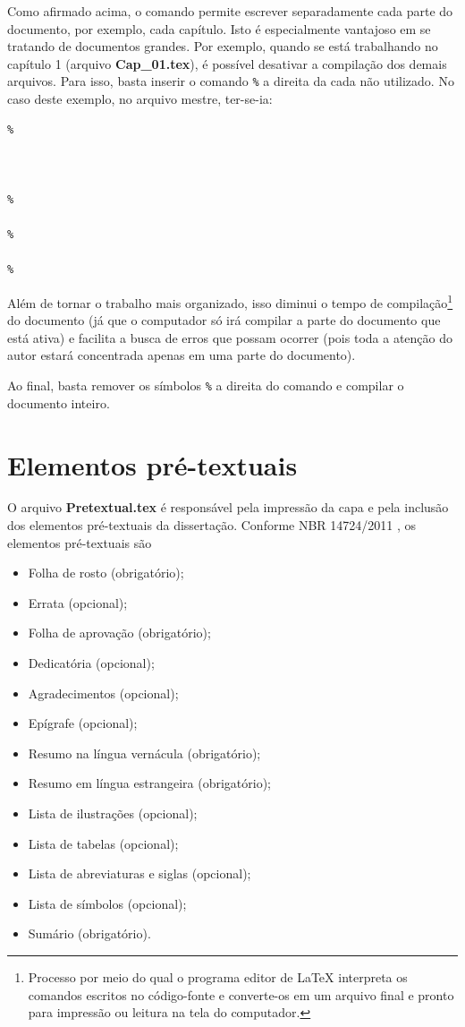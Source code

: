 Como afirmado acima, o comando \verb!! permite escrever separadamente cada parte do documento, por exemplo, cada capítulo. Isto é especialmente vantajoso em se tratando de documentos grandes. Por exemplo, quando se está trabalhando no capítulo 1 (arquivo \textbf{Cap\_01.tex}), é possível desativar a compilação dos demais arquivos. Para isso, basta inserir o comando  \verb!%! a direita da cada \verb!! não utilizado. No caso deste exemplo, no arquivo mestre, ter-se-ia:

\begin{verbatim}
%



%

%

%
\end{verbatim}

Além de tornar o trabalho mais organizado, isso diminui o tempo de compilação\footnote{Processo por meio do qual o programa editor de LaTeX interpreta os comandos escritos no código-fonte e converte-os em um arquivo final e pronto para impressão ou leitura na tela do computador.} do documento (já que o computador só irá compilar a parte do documento que está ativa) e facilita a busca de erros que possam ocorrer (pois toda a atenção do autor estará concentrada apenas em uma parte do documento).

Ao final, basta remover os símbolos \verb!%! a direita do comando \verb!! e compilar o documento inteiro.

\section{Elementos pré-textuais}

O arquivo \textbf{Pretextual.tex} é responsável pela impressão da capa e pela inclusão dos elementos pré-textuais da dissertação. Conforme NBR 14724/2011 \cite{nbr14724}, os elementos pré-textuais são
\begin{itemize}
	\item Folha de rosto (obrigatório);
	\item Errata (opcional);
	\item Folha de aprovação (obrigatório);
	\item Dedicatória (opcional);
	\item Agradecimentos (opcional);
	\item Epígrafe (opcional);
	\item Resumo na língua vernácula (obrigatório);
	\item Resumo em língua estrangeira (obrigatório);
	\item Lista de ilustrações (opcional);
	\item Lista de tabelas (opcional);
	\item Lista de abreviaturas e siglas (opcional);
	\item Lista de símbolos (opcional);
	\item Sumário (obrigatório).
\end{itemize}

